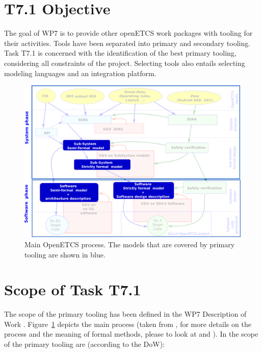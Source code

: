 \section{T7.1 Objective}

The goal of WP7 is to provide other openETCS work packages with tooling for their activities.  Tools have been separated into primary and secondary tooling.  Task T7.1 is concerned with the identification of the best primary tooling, considering all constraints of the project.  Selecting tools also entails selecting modeling languages and an integration platform.

 \begin{figure}[b!]
  \centering
  \includegraphics[scale=0.45]{images/WholeProcess.png}
  \caption{Main OpenETCS process.  The models that are covered by primary tooling are shown in blue.}
  \label{fig:main_process}
\end{figure}


\section{Scope of Task T7.1}

The scope of the primary tooling has been defined in the WP7 Description of Work \citep{WP7_D01}.  Figure~\ref{fig:main_process} depicts the main process (taken from \citep{D2_3}, for more details on the process and the meaning of formal methods, please to look at \citep{D2_3} and \citep{D2_4}).  In the scope of the primary tooling are (according to the DoW):

